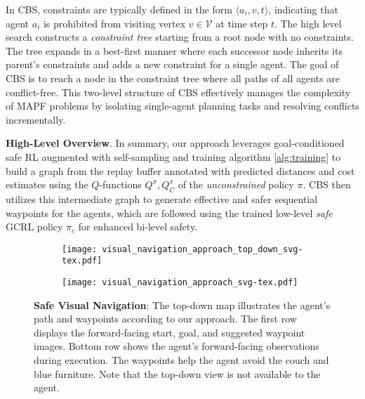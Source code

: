 \documentclass[letterpaper, 10 pt, conference]{IEEEConference}
\begin{document}
In CBS, constraints are typically defined in the form $\langle a_i, v, t \rangle$, indicating that agent $a_i$ is prohibited from visiting vertex $v \in \mathcal{V}$ at time step $t$. The high level search constructs a \textit{constraint tree} starting from a root node with no constraints. The tree expands in a best-first manner where each successor node inherits its parent's constraints and adds a new constraint for a single agent. The goal of CBS is to reach a node in the constraint tree where all paths of all agents are conflict-free. This two-level structure of CBS effectively manages the complexity of MAPF problems by isolating single-agent planning tasks and resolving conflicts incrementally.

\textbf{High-Level Overview}. In summary, our approach leverages goal-conditioned safe RL augmented with self-sampling and training algorithm \ref{alg:training} to build a graph from the replay buffer annotated with predicted distances and cost estimates using the $Q$-functions $Q^{\pi}, Q^{\pi}_C$ of the \textit{unconstrained} policy $\pi$. CBS then utilizes this intermediate graph to generate effective and safer sequential waypoints for the agents, which are followed using the trained low-level \textit{safe} GCRL policy $\pi_c$ for enhanced bi-level safety.

\begin{figure}[ht]
    \centering
    \begin{subfigure}[b]{0.35\textwidth}
       \texttt{[image: visual\_navigation\_approach\_top\_down\_svg-tex.pdf]}
       \label{fig:top_down_map_viz} 
    \end{subfigure}
    \begin{subfigure}[b]{0.48\textwidth}
       \texttt{[image: visual\_navigation\_approach\_svg-tex.pdf]}
       \label{fig:viz_nav}
    \end{subfigure}
    \caption{\textbf{Safe Visual Navigation}: The top-down map illustrates the agent's path and waypoints according to our approach. The first row displays the forward-facing start, goal, and suggested waypoint images. Bottom row shows the agent's forward-facing observations during execution. The waypoints help the agent avoid the couch and blue furniture. Note that the top-down view is not available to the agent.}
    \label{fig:visual_nav}
\end{figure}
\end{document}
